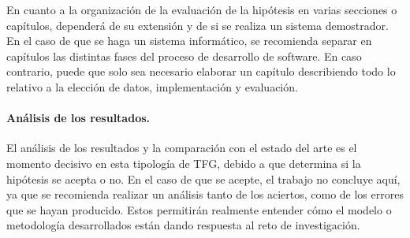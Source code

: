 En cuanto a la organización de la evaluación de la hipótesis en varias secciones o capítulos, dependerá de su extensión y de si se realiza un sistema demostrador. En el caso de que se haga un sistema informático, se recomienda separar en capítulos las distintas fases del proceso de desarrollo de software. En caso contrario, puede que solo sea necesario elaborar un capítulo describiendo todo lo relativo a la elección de datos, implementación y evaluación.

\paragraph{Análisis de los resultados\textnormal{.}} El análisis de los resultados y la comparación con el estado del arte es el momento decisivo en esta tipología de TFG, debido a que determina si la hipótesis se acepta o no. En el caso de que se acepte, el trabajo no concluye aquí, ya que se recomienda realizar un análisis tanto de los aciertos, como de los errores que se hayan producido. Estos permitirán realmente entender cómo el modelo o metodología desarrollados están dando respuesta al reto de investigación.

